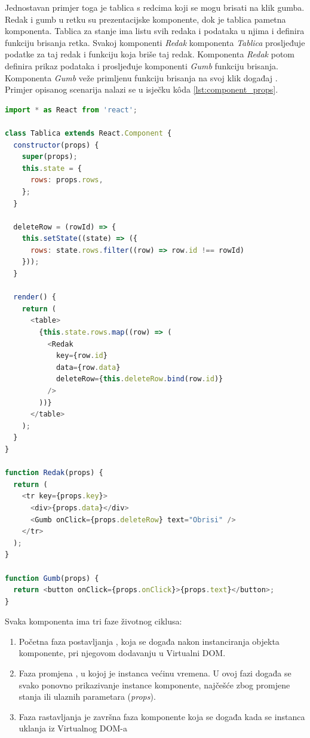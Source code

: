 \documentclass[times, utf8, diplomski, numeric]{fer}
\newcommand{\razmakp}{\vspace{18pt}}
\newcommand{\razmaks}{\vspace{10pt}}
\begin{document}
Jednostavan primjer toga je tablica s redcima koji se mogu brisati na klik gumba.
Redak i gumb u retku su prezentacijske komponente, dok je tablica pametna komponenta.
Tablica za stanje ima listu svih redaka i podataka u njima i definira funkciju brisanja retka.
Svakoj komponenti \emph{Redak} komponenta \emph{Tablica} prosljeđuje podatke za taj redak i funkciju koja briše taj redak.
Komponenta \emph{Redak} potom definira prikaz podataka i prosljeđuje komponenti \emph{Gumb} funkciju brisanja.
Komponenta \emph{Gumb} veže primljenu funkciju brisanja na svoj klik događaj .
Primjer opisanog scenarija nalazi se u isječku kôda \ref{lst:component_props}.

\razmakp %
\begin{lstlisting}[language=JavaScript, caption={Primjer prosljeđivanja podataka i akcija iz roditeljske komponente}, label={lst:component_props}]
import * as React from 'react';

class Tablica extends React.Component {
  constructor(props) {
    super(props);
    this.state = {
      rows: props.rows,
    };
  }

  deleteRow = (rowId) => {
    this.setState((state) => ({
      rows: state.rows.filter((row) => row.id !== rowId)
    }));
  }

  render() {
    return (
      <table>
        {this.state.rows.map((row) => (
          <Redak
            key={row.id}
            data={row.data}
            deleteRow={this.deleteRow.bind(row.id)}
          />
        ))}
      </table>
    );
  }
}

function Redak(props) {
  return (
    <tr key={props.key}>
      <div>{props.data}</div>
      <Gumb onClick={props.deleteRow} text="Obrisi" />
    </tr>
  );
}

function Gumb(props) {
  return <button onClick={props.onClick}>{props.text}</button>;
}
\end{lstlisting}
\razmaks

\noindent Svaka komponenta ima tri faze životnog ciklusa:

\begin{enumerate}
    \item Početna faza postavljanja , koja se događa nakon instanciranja objekta komponente, pri njegovom dodavanju u Virtualni DOM.
    \item Faza promjena , u kojoj je instanca većinu vremena. U ovoj fazi događa se svako ponovno prikazivanje  instance komponente, najčešće zbog promjene stanja ili ulaznih parametara (\emph{props}).
    \item Faza rastavljanja  je završna faza komponente koja se događa kada se instanca uklanja iz Virtualnog DOM-a
\end{enumerate}
\end{document}
